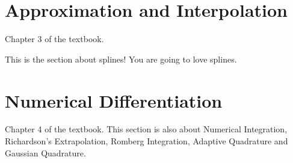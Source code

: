 \documentclass[12pt]{book}
\begin{document}








\chapter{Approximation and Interpolation}
Chapter 3 of the textbook.

This is the section about splines! You are going to love splines.







\chapter{Numerical Differentiation}
Chapter 4 of the textbook. This section is also about Numerical Integration,
Richardson's Extrapolation, Romberg Integration, Adaptive Quadrature and
Gaussian Quadrature.













\end{document}
